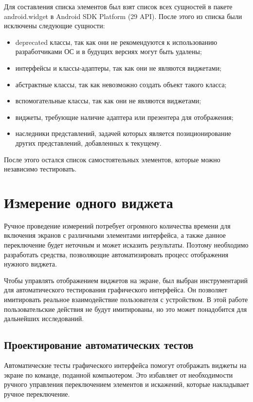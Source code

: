\documentclass[a4paper,14pt]{extarticle} %
\begin{document}
	Для составления списка элементов был взят список всех сущностей в пакете android.widget в Android SDK Platform (29 API). После этого из списка были исключены следующие сущности:
	\begin{itemize}
		\item deprecated классы, так как они не рекомендуются к использованию разработчиками ОС и в будущих версиях могут быть удалены;
		\item интерфейсы и классы-адаптеры, так как они не являются виджетами;
		\item абстрактные классы, так как невозможно создать объект такого класса;
		\item вспомогательные классы, так как они не являются виджетами;
		\item виджеты, требующие наличие адаптера или презентера для отображения;
		\item наследники представлений, задачей которых является позиционирование других представлений, добавленных к текущему.
	\end{itemize}
	
	После этого остался список самостоятельных элементов, которые можно независимо тестировать.
	
	\clearpage
	\section{Измерение одного виджета}
	
	Ручное проведение измерений потребует огромного количества времени для включения экранов с различными элементами интерфейса, а также данное переключение будет неточным и может исказить результаты. Поэтому необходимо разработать средства, позволяющие автоматизировать процесс отображения нужного виджета.
	
	Чтобы управлять отображением виджетов на экране, был выбран инструментарий для автоматического тестирования графического интерфейса. Он позволяет имитировать реальное взаимодействие пользователя с устройством. В этой работе пользовательские действия не будут имитированы, но это может понадобится для дальнейших исследований.
	
	\subsection{Проектирование автоматических тестов}
	
	Автоматические тесты графического интерфейса помогут отображать виджеты на экране по команде, поданной компьютером. Это избавляет от необходимости ручного управления переключением элементов и искажений, которые накладывает ручное переключение.
	
\end{document}
